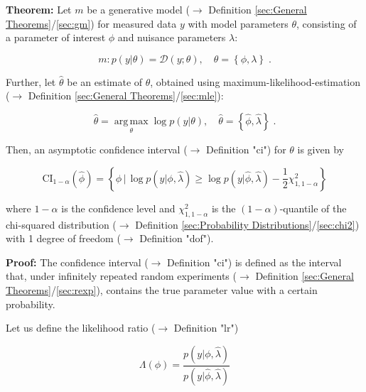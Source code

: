 \documentclass[a4paper,12pt,twoside]{book}
\begin{document}
\textbf{Theorem:} Let $m$ be a generative model ($\rightarrow$ Definition \ref{sec:General Theorems}/\ref{sec:gm}) for measured data $y$ with model parameters $\theta$, consisting of a parameter of interest $\phi$ and nuisance parameters $\lambda$:

\begin{equation} \label{eq:ci-wilks-mod-par}
m: p(y|\theta) = \mathcal{D}(y; \theta), \quad \theta = \left\lbrace \phi, \lambda \right\rbrace \; .
\end{equation}

Further, let $\hat{\theta}$ be an estimate of $\theta$, obtained using maximum-likelihood-estimation ($\rightarrow$ Definition \ref{sec:General Theorems}/\ref{sec:mle}):

\begin{equation} \label{eq:ci-wilks-theta-mle}
\hat{\theta} = \operatorname*{arg\,max}_{\theta} \log p(y|\theta), \quad \hat{\theta} = \left\lbrace \hat{\phi}, \hat{\lambda} \right\rbrace \; .
\end{equation}

Then, an asymptotic confidence interval ($\rightarrow$ Definition "ci") for $\theta$ is given by

\begin{equation} \label{eq:ci-wilks-ci-wilks}
\mathrm{CI}_{1-\alpha}(\hat{\phi}) = \left\lbrace \phi \, \vert \, \log p(y|\phi,\hat{\lambda}) \geq \log p(y|\hat{\phi},\hat{\lambda}) - \frac{1}{2} \chi^2_{1,1-\alpha} \right\rbrace
\end{equation}

where $1-\alpha$ is the confidence level and $\chi^2_{1,1-\alpha}$ is the $(1-\alpha)$-quantile of the chi-squared distribution ($\rightarrow$ Definition \ref{sec:Probability Distributions}/\ref{sec:chi2}) with 1 degree of freedom ($\rightarrow$ Definition "dof").


\vspace{1em}
\textbf{Proof:} The confidence interval ($\rightarrow$ Definition "ci") is defined as the interval that, under infinitely repeated random experiments ($\rightarrow$ Definition \ref{sec:General Theorems}/\ref{sec:rexp}), contains the true parameter value with a certain probability.

Let us define the likelihood ratio ($\rightarrow$ Definition "lr")

\begin{equation} \label{eq:ci-wilks-lr}
\Lambda(\phi) = \frac{p(y|\phi,\hat{\lambda})}{p(y|\hat{\phi},\hat{\lambda})}
\end{equation}
\end{document}
